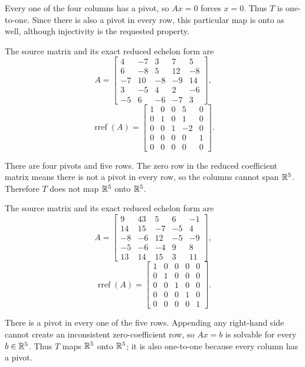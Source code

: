 Every one of the four columns has a pivot, so $Ax=0$ forces $x=0$. Thus $T$ is one-to-one. Since there is also a pivot in every row, this particular map is onto as well, although injectivity is the requested property.



The source matrix and its exact reduced echelon form are
\[ A=\begin{bmatrix}4 & -7 & 3 & 7 & 5\\6 & -8 & 5 & 12 & -8\\-7 & 10 & -8 & -9 & 14\\3 & -5 & 4 & 2 & -6\\-5 & 6 & -6 & -7 & 3\end{bmatrix},\]
\[ \operatorname{rref}(A)=\begin{bmatrix}1 & 0 & 0 & 5 & 0\\0 & 1 & 0 & 1 & 0\\0 & 0 & 1 & -2 & 0\\0 & 0 & 0 & 0 & 1\\0 & 0 & 0 & 0 & 0\end{bmatrix}.\]

There are four pivots and five rows. The zero row in the reduced coefficient matrix means there is not a pivot in every row, so the columns cannot span $\mathbb{R}^5$. Therefore $T$ does not map $\mathbb{R}^5$ onto $\mathbb{R}^5$.



The source matrix and its exact reduced echelon form are
\[ A=\begin{bmatrix}9 & 43 & 5 & 6 & -1\\14 & 15 & -7 & -5 & 4\\-8 & -6 & 12 & -5 & -9\\-5 & -6 & -4 & 9 & 8\\13 & 14 & 15 & 3 & 11\end{bmatrix},\]
\[ \operatorname{rref}(A)=\begin{bmatrix}1 & 0 & 0 & 0 & 0\\0 & 1 & 0 & 0 & 0\\0 & 0 & 1 & 0 & 0\\0 & 0 & 0 & 1 & 0\\0 & 0 & 0 & 0 & 1\end{bmatrix}.\]

There is a pivot in every one of the five rows. Appending any right-hand side cannot create an inconsistent zero-coefficient row, so $Ax=b$ is solvable for every $b\in\mathbb{R}^5$. Thus $T$ maps $\mathbb{R}^5$ onto $\mathbb{R}^5$; it is also one-to-one because every column has a pivot.
